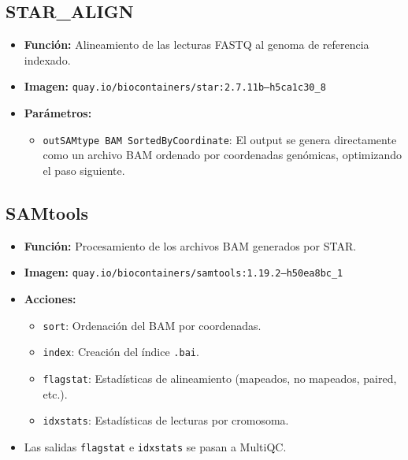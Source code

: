 \documentclass[11pt,a4paper]{article}
\begin{document}
\subsection{STAR\_ALIGN}
\begin{itemize}
    \item \textbf{Función:} Alineamiento de las lecturas FASTQ al genoma de referencia indexado.
    \item \textbf{Imagen:} \texttt{quay.io/biocontainers/star:2.7.11b--h5ca1c30\_8}
    \item \textbf{Parámetros:}
    \begin{itemize}
        \item \texttt{outSAMtype BAM SortedByCoordinate}: El output se genera directamente como un archivo BAM ordenado por coordenadas genómicas, optimizando el paso siguiente.
    \end{itemize}
\end{itemize}

\subsection{SAMtools}
\begin{itemize}
    \item \textbf{Función:} Procesamiento de los archivos BAM generados por STAR.
    \item \textbf{Imagen:} \texttt{quay.io/biocontainers/samtools:1.19.2--h50ea8bc\_1}
    \item \textbf{Acciones:}
    \begin{itemize}
        \item \texttt{sort}: Ordenación del BAM por coordenadas.
        \item \texttt{index}: Creación del índice \texttt{.bai}.
        \item \texttt{flagstat}: Estadísticas de alineamiento (mapeados, no mapeados, paired, etc.).
        \item \texttt{idxstats}: Estadísticas de lecturas por cromosoma.
    \end{itemize}
    \item Las salidas \texttt{flagstat} e \texttt{idxstats} se pasan a MultiQC.
\end{itemize}
\end{document}
